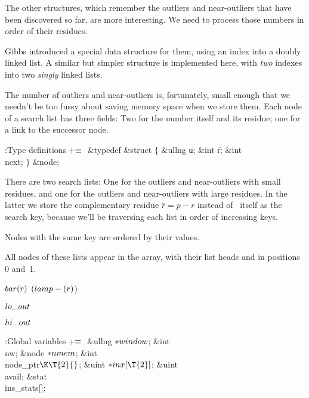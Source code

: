 The other structures, which remember the outliers and near-outliers
that have been discovered so far, are more interesting. We need to
process those numbers in order of their residues.

Gibbs introduced a special data structure for them, using an index into
a doubly linked list. A similar but simpler structure is implemented here,
with {\it two\/} indexes into two {\it singly\/} linked lists.

The number of outliers and near-outliers is, fortunately, small enough
that we needn't be too fussy about saving memory space when we store them.
Each node of a search list has three fields: Two for the number itself
and its residue; one for a link to the successor node.

\Y\B\4:Type definitions\X${}\mathrel+\equiv{}$\6
\&{typedef} \&{struct} ${}\{{}$\1\6
\&{ullng} \|u;\6
\&{int} \|r;\6
\&{int} \\{next};\2\6
${}\}{}$ \&{node};\par
\fi

There are two search lists: One for the outliers and near-outliers
with small residues, and one for the outliers and near-outliers with
large residues. In the latter we store the complementary residue
$\bar r=p-r$ instead of~ itself as the search key, because we'll be
traversing each list in order of increasing keys.

Nodes with the same  key are ordered by their  values.

All nodes of these lists appear in the  array, with their list
heads
 and  in positions 0 and~1.

\Y\B\4\D$\\{bar}(\|r)$ \5
$(\\{lamp}-(\|r){}$)\par
\B\4\D$\\{lo\_out}$ \5
\par
\B\4\D$\\{hi\_out}$ \5
\par
\Y\B\4:Global variables\X${}\mathrel+\equiv{}$\6
\&{ullng} ${}{*}\\{window}{}$;\6
\&{int} \\{nw};\6
\&{node} ${}{*}\\{nmem}{}$;\6
\&{int} \\{node\_ptr}${}\K\T{2}{}$;\6
\&{uint} ${}{*}\\{inx}[\T{2}]{}$;\6
\&{uint} \\{avail};\6
\&{stat} \\{ins\_stats}[];\par
\fi

